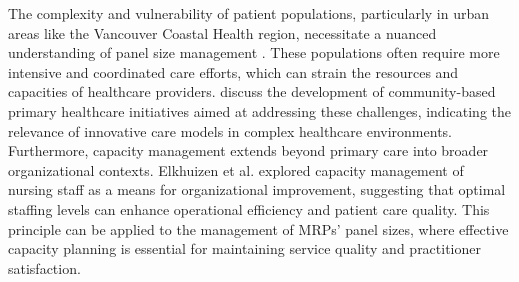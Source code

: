 \documentclass[11pt]{article}
\theoremstyle{definition}
\begin{document}
The complexity and vulnerability of patient populations, particularly in urban areas like the Vancouver Coastal Health region, necessitate a nuanced understanding of panel size management \cite{shukor2018}. These populations often require more intensive and coordinated care efforts, which can strain the resources and capacities of healthcare providers. \cite{shukor2018} discuss the development of community-based primary healthcare initiatives aimed at addressing these challenges, indicating the relevance of innovative care models in complex healthcare environments.\\

Furthermore, capacity management extends beyond primary care into broader organizational contexts. Elkhuizen et al. \cite{elkhuizen2007} explored capacity management of nursing staff as a means for organizational improvement, suggesting that optimal staffing levels can enhance operational efficiency and patient care quality. This principle can be applied to the management of MRPs’ panel sizes, where effective capacity planning is essential for maintaining service quality and practitioner satisfaction.\\
\end{document}
